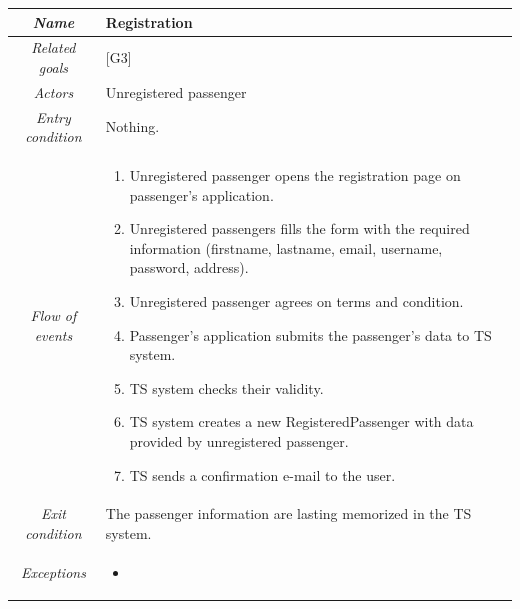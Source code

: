 \begin{flushleft}
\begin{tabular}{c|>{\centering}p{10cm}}
\hline 
\emph{Name} & \raggedright{}Registration\tabularnewline
\hline 
\emph{Related goals} & \raggedright{}{[}G3{]}\tabularnewline
\hline 
\emph{Actors} & \raggedright{}Unregistered passenger\tabularnewline
\hline 
\emph{Entry condition} & \raggedright{}Nothing.\tabularnewline
\hline 
\emph{Flow of events} & \begin{enumerate}
\item \begin{raggedright}
Unregistered passenger opens the registration page on passenger's
application.
\par\end{raggedright}
\item \begin{raggedright}
Unregistered passengers fills the form with the required information
(firstname, lastname, email, username, password, address).
\par\end{raggedright}
\item \begin{raggedright}
Unregistered passenger agrees on terms and condition.
\par\end{raggedright}
\item \begin{raggedright}
Passenger's application submits the passenger's data to TS system.
\par\end{raggedright}
\item \begin{raggedright}
TS system checks their validity.
\par\end{raggedright}
\item \begin{raggedright}
TS system creates a new RegisteredPassenger with data provided by
unregistered passenger.
\par\end{raggedright}
\item \raggedright{}TS sends a confirmation e-mail to the user.\end{enumerate}
\tabularnewline
\hline 
\emph{Exit condition} & \raggedright{}The passenger information are lasting memorized in the
TS system.\tabularnewline
\hline 
\emph{Exceptions} & \begin{itemize}
\item \begin{raggedright}

\end{raggedright}
\end{itemize}
\end{tabular}
\end{flushleft}
